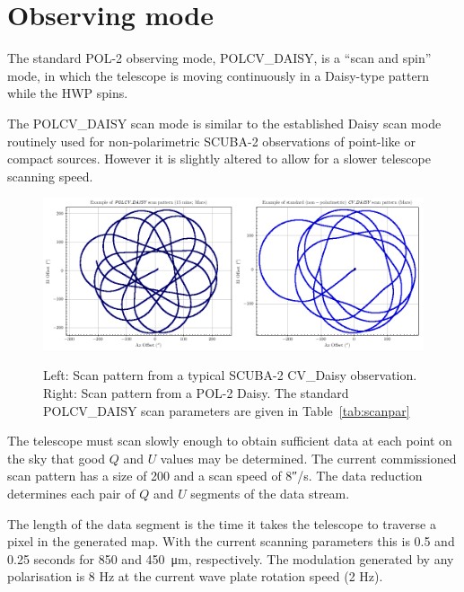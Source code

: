 \section{Observing mode}
\label{sec:mmodes}

The standard POL-2 observing mode, POLCV\_DAISY, is a “scan and spin” mode,
in which the telescope is moving continuously in a Daisy-type pattern while the
HWP spins.

The POLCV\_DAISY scan mode is similar to the established Daisy scan mode
routinely used for non-polarimetric SCUBA-2 observations of point-like or compact
sources. However it is slightly altered to allow for a slower telescope scanning
speed.


\begin{figure}[t!]
\begin{center}
\includegraphics[width=0.9\linewidth]{scan_pattern_daisy_comparison.png}
\label{fig:scancompsrison}
\caption [Scan Pattern Comparison]{Left: Scan pattern from a typical SCUBA-2 CV_Daisy 
observation. Right: Scan pattern from a POL-2 Daisy. The standard POLCV\_DAISY scan 
parameters are given in Table~\ref{tab:scanpar}
  \small
}
\end{center}
\end{figure}




The telescope must scan slowly enough to obtain sufficient data at each 
point on the sky that good $Q$ and $U$ values may be determined. The current 
commissioned scan pattern has a size of 200\arcs{} and a scan speed of 
8\si{\arcsecond}/s. The data reduction determines each pair of $Q$ and $U$ 
segments of the data stream. 


The length of the data segment is the time it takes the telescope to traverse
a pixel in the generated map. With the current scanning parameters this is 0.5 and 
0.25 seconds for 850 and \SI{450}{\micro\metre}, respectively. The modulation 
generated by any polarisation is 8 Hz at the current wave plate rotation speed 
(2 Hz). 

